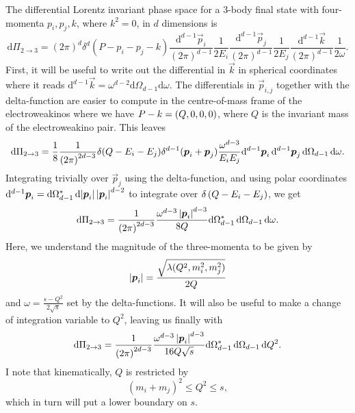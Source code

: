 \documentclass[../main.tex]{subfiles}
\begin{document}
The differential Lorentz invariant phase space for a 3-body final state with
four-momenta \(p_i, p_j, k\), where \(k^2=0\), in \(d\) dimensions is
\begin{equation}
  \mathrm{d}\Pi_{2\to 3} = (2\pi)^d \delta^d(P - p_i - p_j - k)
  \frac{\mathrm{d}^{d-1} \vec{p}_i}{(2\pi)^{d-1}} \frac{1}{2E_i}
  \frac{\mathrm{d}^{d-1} \vec{p}_j}{(2\pi)^{d-1}} \frac{1}{2E_j}
  \frac{\mathrm{d}^{d-1} \vec{k}}{(2\pi)^{d-1}} \frac{1}{2\omega}.
\end{equation}
First, it will be useful to write out the differential in \(\vec{k}\) in
spherical coordinates where it reads \(\mathrm{d}^{d-1}\vec{k} = \omega^{d-2}
\mathrm{d}\Omega_{d-1} \mathrm{d}\omega\).
The differentials in \(\vec{p}_{i,j}\) together with the delta-function are
easier to compute in the centre-of-mass frame of the electroweakinos where we have
\(P - k = \left(Q, 0, 0, 0\right)\), where \(Q\) is the invariant mass of the electroweakino pair.
This leaves
\begin{equation}
  \label{pc:eq:dPi_2to3}
  \mathrm{d}\Pi_{2\to 3} = \frac{1}{8} \frac{1}{\left(2\pi\right)^{2d-3}}
  \delta(Q - E_i - E_j) \delta^{d-1}(\boldsymbol{p}_i +
  \boldsymbol{p}_j) \frac{\omega^{d-3}}{E_i E_j}
  \mathrm{d}^{d-1}\boldsymbol{p}_i\, \mathrm{d}^{d-1}\boldsymbol{p}_j\,
  \mathrm{d}\Omega_{d-1}\, \mathrm{d}\omega.
\end{equation}
Integrating trivially over \(\vec{p}_j\) using the delta-function, and
using polar coordinates \(\mathrm{d}^{d-1}\boldsymbol{p}_i =
\mathrm{d}\Omega_{d-1}^\ast \, \mathrm{d}\!\left|\boldsymbol{p}_i\right|
\left|\boldsymbol{p}_i\right|^{d-2}\) to integrate over \(\delta\left(Q - E_i - E_j\right)\), we get
\begin{equation}
  \mathrm{d}\Pi_{2\to 3} = \frac{1}{\left(2\pi\right)^{2d-3}}
  \frac{\omega^{d-3} \left|\boldsymbol{p}_i\right|^{d-3}}{8Q}
  \mathrm{d}\Omega_{d-1}^\ast\, \mathrm{d}\Omega_{d-1}\,
  \mathrm{d}\omega.
\end{equation}
Here, we understand the magnitude of the three-momenta to be given by
\begin{equation}
  \left|\boldsymbol{p}_i\right| = \frac{\sqrt{\lambda(Q^2, m_i^2, m_j^2)}}{2Q}
\end{equation}
and \(\omega = \frac{s-Q^2}{2\sqrt{s}}\) set by the delta-functions.
It will also be useful to make a change of integration variable to \(Q^2\), leaving us finally with
\begin{equation}
  \mathrm{d}\Pi_{2\to 3} = \frac{1}{\left(2\pi\right)^{2d-3}}
  \frac{\omega^{d-3} \left|\boldsymbol{p}_i\right|^{d-3}}{16Q\sqrt{s}}
  \mathrm{d}\Omega_{d-1}^\ast\, \mathrm{d}\Omega_{d-1}\, \mathrm{d}Q^2.
\end{equation}
I note that kinematically, \(Q\) is restricted by
\begin{equation}
  (m_i + m_j)^2 \leq Q^2 \leq s,
\end{equation}
which in turn will put a lower boundary on \(s\).
\end{document}
